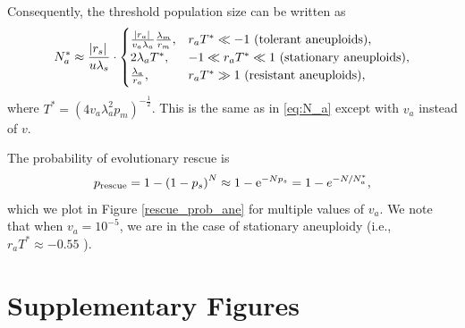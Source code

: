 \documentclass[12pt]{extarticle}
\newcommand{\e}{{\rm e}}
\newcommand{\presc}{p_\text{rescue}}
\renewcommand{\Delta}{r}
\newcommand{\beginsupplement}{%
      	\setcounter{table}{0}
        \renewcommand{\thetable}{S\arabic{table}}%
        \setcounter{figure}{0}
        \renewcommand{\thefigure}{S\arabic{figure}}%
		\setcounter{equation}{0}
        \renewcommand{\theequation}{A\arabic{equation}}%
}
\begin{document}
\begin{appendices}
Consequently, the threshold population size can be written as
\begin{equation}\label{eq:N_a2}
\begin{aligned}
N_a^* \approx 
  \frac{\abs{\Delta_s}}{u\lambda_s} \cdot \begin{cases}
    \frac{\abs{\Delta_a}}{v_a\lambda_a}  \frac{\lambda_m}{\Delta_m} ,&
  \Delta_a T^* \ll -1 \text{ (tolerant aneuploids)},\\ 
  2\lambda_a T^* ,&
  -1 \ll \Delta_a T^* \ll 1  \text{ (stationary aneuploids)},\\ 
  \frac{\lambda_a}{\Delta_a} ,&
   \Delta_a T^* \gg 1 \text{ (resistant aneuploids)},
  \end{cases}
\end{aligned}
\end{equation}
where $T^*=\left(4v_a\lambda_a^2p_m\right)^{-\frac{1}{2}}$.
This is the same as in \cref{eq:N_a} except with $v_a$ instead of $v$.

The probability of evolutionary rescue is
\begin{equation} \label{eq:rescue_prob_ane} 
\presc = 
1-\left(1-p_s\right)^N \approx
1-\e^{-Np_s} = 
1-e^{-N/N_a^*} ,
\end{equation}
which we plot in Figure \ref{rescue_prob_ane} for multiple values of $v_a$. We note that when $v_a=10^{-5}$, we are in the case of stationary aneuploidy (i.e., $\Delta_a T^*\approx -0.55$ ). 

\newpage
\section*{Supplementary Figures}
\beginsupplement %


\end{appendices}
\end{document}
